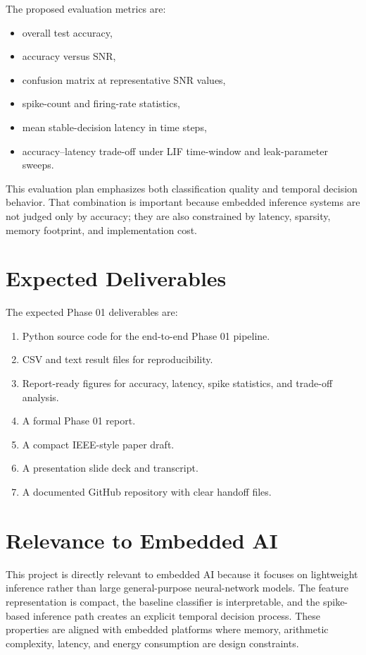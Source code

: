 \documentclass[11pt]{report}
\begin{document}
The proposed evaluation metrics are:

\begin{itemize}
    \item overall test accuracy,
    \item accuracy versus SNR,
    \item confusion matrix at representative SNR values,
    \item spike-count and firing-rate statistics,
    \item mean stable-decision latency in time steps,
    \item accuracy--latency trade-off under LIF time-window and leak-parameter sweeps.
\end{itemize}

This evaluation plan emphasizes both classification quality and temporal decision behavior. That combination is important because embedded inference systems are not judged only by accuracy; they are also constrained by latency, sparsity, memory footprint, and implementation cost.

\section{Expected Deliverables}

The expected Phase 01 deliverables are:

\begin{enumerate}[label=\arabic*.]
    \item Python source code for the end-to-end Phase 01 pipeline.
    \item CSV and text result files for reproducibility.
    \item Report-ready figures for accuracy, latency, spike statistics, and trade-off analysis.
    \item A formal Phase 01 report.
    \item A compact IEEE-style paper draft.
    \item A presentation slide deck and transcript.
    \item A documented GitHub repository with clear handoff files.
\end{enumerate}

\section{Relevance to Embedded AI}

This project is directly relevant to embedded AI because it focuses on lightweight inference rather than large general-purpose neural-network models. The feature representation is compact, the baseline classifier is interpretable, and the spike-based inference path creates an explicit temporal decision process. These properties are aligned with embedded platforms where memory, arithmetic complexity, latency, and energy consumption are design constraints.
\end{document}
